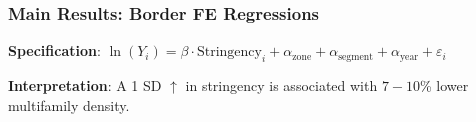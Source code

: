 \begin{frame}[label=density-reg-main]
    \frametitle{Main Results: Border FE Regressions}
    
    \small
    \textbf{Specification}: 
    $\ln(Y_i) = \beta \cdot \text{Stringency}_i + \alpha_{\text{zone}} + \alpha_{\text{segment}} + \alpha_{\text{year}} + \varepsilon_i$\\
    
    \begin{center}
    
    \end{center}
    
    \vspace{0.1em}
    \textbf{Interpretation}: A 1 SD $\uparrow$ in stringency is associated with $7-10$\% lower multifamily density.

    \vspace{-0.4em}
    \vfill\hfill
    \hyperlink{density-reg-pruned}{}
    \hspace{0.1em}
    \hyperlink{density-reg-zone-pair-year}{}
    \hspace{0.1em}
    \hyperlink{density-reg-bw250}{}

\end{frame}
